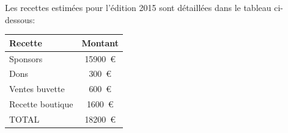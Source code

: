 \Separateur

Les recettes estimées pour l'édition 2015 sont détaillées dans le tableau ci-dessous:

\begin{center}
    \begin{tabular}{|l|c|}
        \hline Recette & Montant \\
        \hline Sponsors & \SI{15900}{\euro} \\
        \hline Dons & \SI{300}{\euro} \\
        \hline Ventes buvette & \SI{600}{\euro} \\
        \hline Recette boutique & \SI{1600}{\euro} \\
        \hline TOTAL & \SI{18200}{\euro} \\
        \hline
    \end{tabular}
\end{center}

